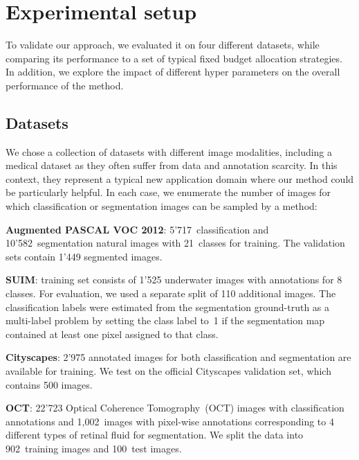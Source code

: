 \section{Experimental setup}
\label{sec:experiments_fullweak}

To validate our approach, we evaluated it on four different datasets, while comparing its performance to a set of typical fixed budget allocation strategies. In addition, we explore the impact of different hyper parameters on the overall performance of the method. 

\subsection{Datasets} 
We chose a collection of datasets with different image modalities, including a medical dataset as they often suffer from data and annotation scarcity. In this context, they represent a typical new application domain where our method could be particularly helpful. In each case, we enumerate the number of images for which classification or segmentation images can be sampled by a method:
\begin{description}
    \item \textbf{Augmented PASCAL VOC 2012}: 5'717~classification and 10'582~segmentation natural images with 21~classes for training. The validation sets contain 1'449 segmented images.
    \item \textbf{SUIM}: training set consists of 1'525 underwater images with annotations for 8 classes. For evaluation, we used a separate split of 110 additional images. The classification labels were estimated from the segmentation ground-truth as a multi-label problem by setting the class label to~1 if the segmentation map contained at least one pixel assigned to that class.
    \item \textbf{Cityscapes}: 2'975 annotated images for both classification and segmentation are available for training. We test on the official Cityscapes validation set, which contains 500 images. 
    \item \textbf{OCT}: 22'723 Optical Coherence Tomography~(OCT) images with classification annotations and 1,002~images with pixel-wise annotations corresponding to 4 different types of retinal fluid for segmentation. We split the data into 902~training images and 100~test images.
\end{description}

